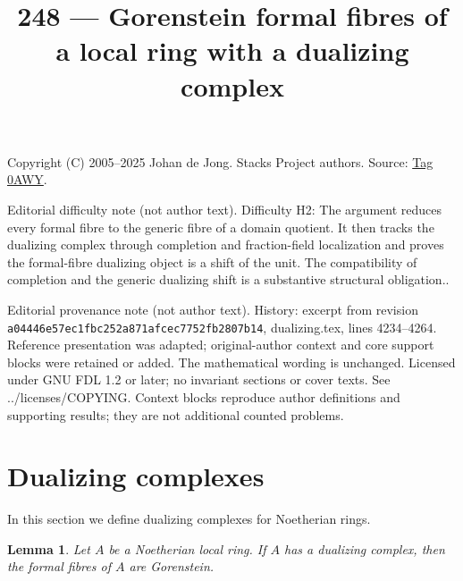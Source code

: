 \documentclass{amsart}
\theoremstyle{plain}
\newtheorem{lemma}[subsection]{Lemma}
\theoremstyle{definition}
\theoremstyle{remark}
\numberwithin{equation}{subsection}
\begin{document}
\title[Stacks Project, Tag 0AWY]{248 --- Gorenstein formal fibres of a local ring with a dualizing complex}
\maketitle
\noindent Copyright (C) 2005--2025 Johan de Jong. Stacks Project authors. Source: \href{https://stacks.math.columbia.edu/tag/0AWY}{Tag 0AWY}.

\noindent Editorial difficulty note (not author text). Difficulty H2: The argument reduces every formal fibre to the generic fibre of a domain quotient. It then tracks the dualizing complex through completion and fraction-field localization and proves the formal-fibre dualizing object is a shift of the unit. The compatibility of completion and the generic dualizing shift is a substantive structural obligation..

\noindent Editorial provenance note (not author text). History: excerpt from revision \texttt{a0444\allowbreak 6e57e\allowbreak c1fbc\allowbreak 252a8\allowbreak 71afc\allowbreak ec775\allowbreak 2fb28\allowbreak 07b14}, dualizing.tex, lines 4234--4264. Reference presentation was adapted; original-author context and core support blocks were retained or added. The mathematical wording is unchanged. Licensed under GNU FDL 1.2 or later; no invariant sections or cover texts. See ../licenses/COPYING. Context blocks reproduce author definitions and supporting results; they are not additional counted problems.

\section{Dualizing complexes}
\label{section-dualizing}

\noindent
In this section we define dualizing complexes for Noetherian rings.



\begin{lemma}
\label{lemma-dualizing-gorenstein-formal-fibres}
Let $A$ be a Noetherian local ring. If $A$ has a dualizing complex,
then the formal fibres of $A$ are Gorenstein.
\end{lemma}
\end{document}

